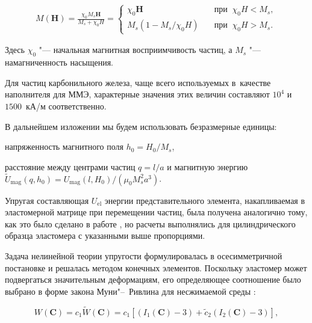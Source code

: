 \begin{gather}

\label{eq:F-K}%

M({\boldsymbol H})=\frac{\chi_0 M_s {\boldsymbol H}}{M_s+\chi_0  H } 

=\left\{

\begin{array}{ll}

\chi_0 {\boldsymbol H} \quad & \text{при}\;\;\chi_0 H< M_s,\\

M_s \left(1 - M_s/\chi_0 H \right) \quad & \text{при}\;\; \chi_0 H> M_s.

\end{array} \right.

\end{gather}

Здесь $\chi_0$ "--- начальная магнитная восприимчивость частиц, а $M_s$ "--- намагниченность насыщения. 

Для частиц карбонильного железа, чаще всего используемых в~качестве наполнителя для ММЭ, характерные значения этих величин составляют $10^4$ и $1500$~кА/м соответственно. 

В дальнейшем изложении мы будем использовать безразмерные единицы: 

напряженность магнитного поля ${h_0=H_0/M_s}$, 

расстояние между центрами частиц $q=l/a$ и магнитную энергию $\tilde{U}_{\text{mag}}(q,h_0)=U_{\text{mag}}(l,H_0)/(\mu_0 M_s^2 a^3)$.



Упругая составляющая $U_{\text{el}}$ энергии представительного элемента, накапливаемая в эластомерной матрице при перемещении частиц, была получена аналогично тому, как это было сделано в работе \cite{VMSS_15}, но расчеты выполнялись для цилиндрического образца эластомера с указанными выше пропорциями. 

Задача нелинейной теории упругости формулировалась в осесимметричной постановке и решалась методом конечных элементов. Поскольку эластомер может подвергаться значительным деформациям, его определяющее соотношение было выбрано в форме закона Муни"--~Ривлина для несжимаемой среды \cite{Oswald_09}:

\begin{equation}

\label{eq:M-R}%

W(\mathbf C)= c_1 \tilde W(\mathbf C)= c_1\left[ \left( I_1(\mathbf C) - 3\right) + \tilde c_2\left( I_2(\mathbf C) - 3 \right) \right],

\end{equation}

